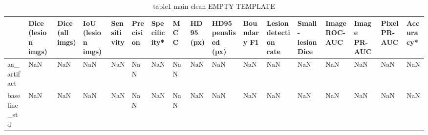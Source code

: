 \begin{table}
\caption{table1 main clean EMPTY TEMPLATE}
\label{tab:table1_main_clean_EMPTY_TEMPLATE}
\begin{tabular}{lllllllllllllllll}
\toprule
 & Dice (lesion imgs) & Dice (all imgs) & IoU (lesion imgs) & Sensitivity & Precision & Specificity* & MCC & HD95 (px) & HD95 penalised (px) & Boundary F1 & Lesion detection rate & Small-lesion Dice & Image ROC-AUC & Image PR-AUC & Pixel PR-AUC & Accuracy* \\
\midrule
aa\_artifact & NaN & NaN & NaN & NaN & NaN & NaN & NaN & NaN & NaN & NaN & NaN & NaN & NaN & NaN & NaN & NaN \\
baseline\_std & NaN & NaN & NaN & NaN & NaN & NaN & NaN & NaN & NaN & NaN & NaN & NaN & NaN & NaN & NaN & NaN \\
\bottomrule
\end{tabular}
\end{table}
